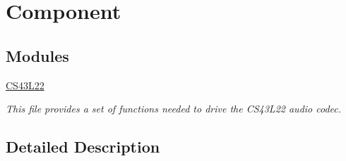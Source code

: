 \hypertarget{group___component}{}\section{Component}
\label{group___component}
\subsection*{Modules}
\begin{DoxyCompactItemize}
\item 
\mbox{\hyperlink{group___c_s43_l22}{C\+S43\+L22}}
\begin{DoxyCompactList}\small\item\em This file provides a set of functions needed to drive the C\+S43\+L22 audio codec. \end{DoxyCompactList}\end{DoxyCompactItemize}


\subsection{Detailed Description}
